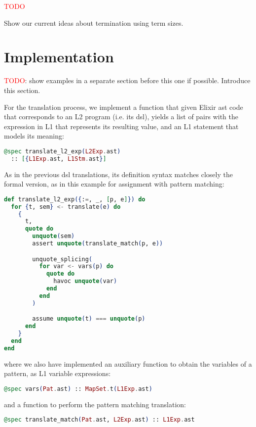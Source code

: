 \textcolor{red}{TODO}

Show our current ideas about termination using term sizes.

\section{Implementation}

\textcolor{red}{TODO}: show examples in a separate section before this one if possible. Introduce this section.

For the translation process, we implement a function that given Elixir \gls{ast}
code that corresponds to an L2 program (i.e. its \gls{dsl}), yields a list of
pairs with the expression in L1 that represents its resulting value, and an L1
statement that models its meaning:

\begin{lstlisting}[language=elixir,numbers=none,frame=none]
@spec translate_l2_exp(L2Exp.ast) 
  :: [{L1Exp.ast, L1Stm.ast}]
\end{lstlisting}

As in the previous \gls{dsl} translations, its definition syntax matches closely
the formal version, as in this example for assignment with pattern matching:

\begin{lstlisting}[language=elixir,numbers=none,frame=none]
def translate_l2_exp({:=, _, [p, e]}) do
  for {t, sem} <- translate(e) do
    {
      t,
      quote do
        unquote(sem)
        assert unquote(translate_match(p, e))

        unquote_splicing(
          for var <- vars(p) do
            quote do
              havoc unquote(var)
            end
          end
        )

        assume unquote(t) === unquote(p)
      end
    }
  end
end
\end{lstlisting}

where we also have implemented an auxiliary function to obtain the variables of
a pattern, as L1 variable expressions:

\begin{lstlisting}[language=elixir,numbers=none,frame=none]
@spec vars(Pat.ast) :: MapSet.t(L1Exp.ast)
\end{lstlisting}

and a function to perform the pattern matching translation:

\begin{lstlisting}[language=elixir,numbers=none,frame=none]
@spec translate_match(Pat.ast, L2Exp.ast) :: L1Exp.ast
\end{lstlisting}


